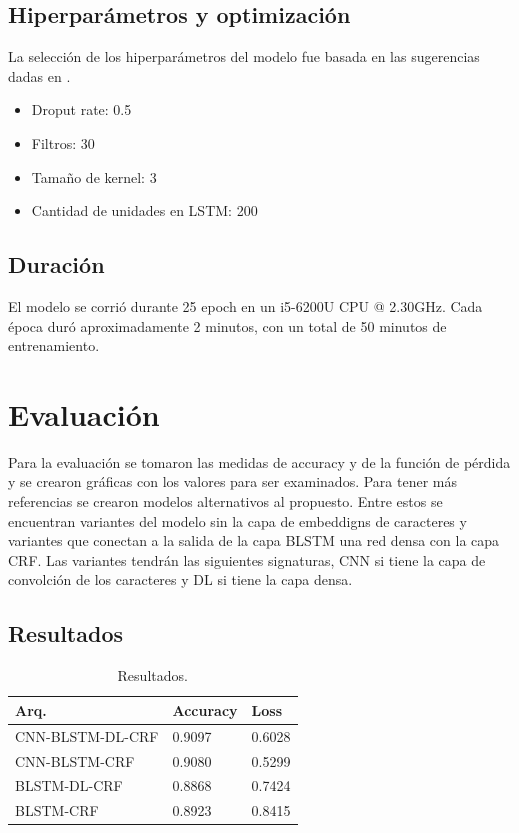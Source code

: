 \documentclass[runningheads]{llncs}
\begin{document}
\subsection{Hiperparámetros y optimización}

La selección de los hiperparámetros del modelo fue basada en las sugerencias dadas en
\cite{paper}.

\begin{itemize}
	\item Droput rate: 0.5
	\item Filtros: 30
	\item Tamaño de kernel: 3
	\item Cantidad de unidades en LSTM: 200  
\end{itemize}

\subsection{Duración}

El modelo se corrió durante 25 epoch en un i5-6200U CPU @ 2.30GHz. Cada época
duró aproximadamente 2 minutos, con un total de 50 minutos de entrenamiento.

\section{Evaluación}

Para la evaluación se tomaron las medidas de accuracy y de la función de pérdida y se
crearon gráficas con los valores para ser examinados. Para tener más referencias se
crearon modelos alternativos al propuesto. Entre estos se encuentran variantes del
modelo sin la capa de embeddigns de caracteres y variantes que conectan a la salida
de la capa BLSTM una red densa con la capa CRF. Las variantes tendrán las siguientes
signaturas, CNN si tiene la capa de convolción de los caracteres y DL si tiene la capa
densa.

\subsection{Resultados}

\begin{table}
	\centering
	\caption{Resultados.}\label{results}
	\begin{tabular}{|l|l|l|}
	\hline
		Arq. &  Accuracy & Loss \\
	\hline
		CNN-BLSTM-DL-CRF & 0.9097 & 0.6028 \\
		CNN-BLSTM-CRF 	  & 0.9080 & 0.5299 \\
		BLSTM-DL-CRF 	  & 0.8868 & 0.7424 \\
		BLSTM-CRF 		  & 0.8923 & 0.8415 \\
	\hline
	\end{tabular}
\end{table}
\end{document}
